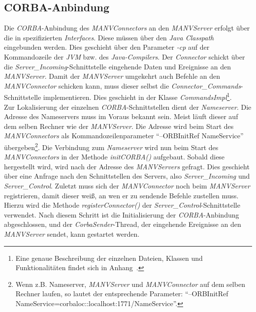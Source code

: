 \subsection{CORBA-Anbindung}
Die \emph{CORBA}-Anbindung des \emph{MANVConnectors} an den \emph{MANVServer} erfolgt über
die in \cite{Jan} spezifizierten \emph{Interfaces}. Diese müssen über den \emph{Java Classpath}
eingebunden werden. Dies geschieht über den Parameter \emph{-cp} auf der Kommandozeile
der \emph{JVM} bzw. des \emph{Java-Compilers}. Der \emph{Connector} schickt über die 
\emph{Server\_Incoming}-Schnittstelle eingehende Daten und Ereignisse an den \emph{MANVServer}.
Damit der \emph{MANVServer} umgekehrt auch Befehle an den \emph{MANVConnector} schicken kann,
muss dieser selbst die \emph{Connector\_Commands}-Schnittstelle implementieren. Dies
geschieht in der Klasse \emph{CommandsImpl}\footnote{Eine
genaue Beschreibung der einzelnen Dateien, Klassen und Funktionalitäten findet sich in
Anhang~\label{anhang_beschreibung_software}.}.\\

Zur Lokalisierung der einzelnen \emph{CORBA}-Schnittstellen dient der \emph{Nameserver}.
Die Adresse des Nameservers muss im Voraus bekannt sein. Meist läuft dieser auf dem selben Rechner
wie der \emph{MANVServer}. Die Adresse wird beim Start des \emph{MANVConnectors} als 
Kommandozeilenparameter "`--ORBInitRef NameService"' übergeben\footnote{Wenn z.B. Nameserver, \emph{MANVServer}
und \emph{MANVConnector} auf dem selben Rechner laufen, so lautet der entsprechende Parameter:
"`--ORBInitRef NameService=corbaloc::localhost:1771/NameService"'.}. Die Verbindung zum \emph{Nameserver}
wird nun beim Start des \emph{MANVConnectors} in der Methode \emph{initCORBA()} aufgebaut. 
Sobald diese hergestellt wird, wird nach der Adresse des \emph{MANVServers} gefragt. Dies geschieht über
eine Anfrage nach den Schnittstellen des Servers, also \emph{Server\_Incoming} und \emph{Server\_Control}. 
Zuletzt muss sich der \emph{MANVConnector} noch beim \emph{MANVServer} registrieren, damit dieser
weiß, an wen er zu sendende Befehle zustellen muss. Hierzu wird die Methode \emph{registerConnector()}
der \emph{Server\_Control}-Schnittstelle verwendet. Nach diesem Schritt ist die Initialisierung der
\emph{CORBA}-Anbindung abgeschlossen, und der \emph{CorbaSender}-Thread, der eingehende Ereignisse
an den \emph{MANVServer} sendet, kann gestartet werden.

